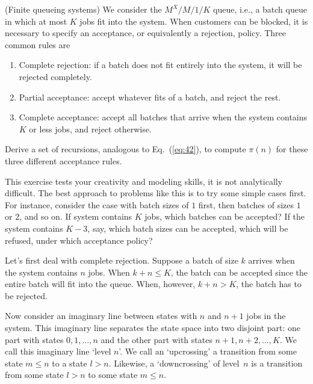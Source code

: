 \begin{exercise}(Finite queueing systems) We consider the $M^X/M/1/K$
queue, i.e., a batch queue in which at most $K$ jobs fit into the
system. When customers can be blocked, it is necessary to specify an
acceptance, or equivalently a rejection, policy. Three common rules are
\begin{enumerate}
\item Complete rejection: if a batch does not fit entirely into the system, it will be rejected completely.
\item Partial acceptance: accept whatever fits of a batch, and reject the rest.
\item Complete acceptance: accept all batches that arrive when the
  system contains $K$ or less jobs, and reject otherwise.
\end{enumerate}
Derive a set of recursions, analogous to Eq.~(\ref{eq:42}), to compute
$\pi(n)$ for these three different acceptance rules.  
\begin{hint}
This
  exercise tests your creativity and modeling skills, it is not
  analytically difficult.  The best approach to problems like this is
  to try some simple cases first. For instance, consider the case with
  batch sizes of $1$ first, then batches of sizes $1$ or $2$, and so
  on. If system contains $K$ jobs, which batches can be accepted? If
  the system contains $K-3$, say, which batch sizes can be accepted,
  which will be refused, under which acceptance policy? 
\end{hint}
\begin{solution}
  Let's first deal with complete rejection. Suppose a batch of size
  $k$ arrives when the system contains $n$ jobs. When $k+n \leq K$,
  the batch can be accepted since the entire batch will fit into the
  queue.  When, however, $k+n> K$, the batch has to be rejected. 

  Now consider an imaginary line between states with $n$ and $n+1$
  jobs in the system. This imaginary line separates the state space
  into two disjoint part: one part with states $0, 1, \ldots, n$ and
  the other part with states $n+1, n+2, \ldots, K$. We call this
  imaginary line `level $n$'.  We call an `upcrossing' a transition
  from some state $m\leq n$ to a state $l> n$. Likewise, a `downcrossing'  of level~$n$ is a transition from some state $l> n$ to some state $m\leq n$.


\end{solution}
\end{exercise}
